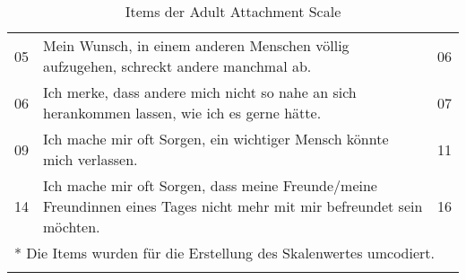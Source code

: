 \begin{table}[htbp]
\begin{tabular}{|l | m{30em} | p{2em}|}
  05 & Mein Wunsch, in einem anderen Menschen völlig aufzugehen, schreckt andere manchmal ab. & 06 \\
  06 & Ich merke, dass andere mich nicht so nahe an sich herankommen lassen, wie ich es gerne hätte. & 07 \\
  09 & Ich mache mir oft Sorgen, ein wichtiger Mensch könnte mich verlassen. & 11 \\
  14 & Ich mache mir oft Sorgen, dass meine Freunde/meine Freundinnen eines Tages nicht mehr mit mir befreundet sein möchten. & 16 \\
  \hline
  \multicolumn{3}{l}{* Die Items wurden für die Erstellung des Skalenwertes umcodiert.}\\
  \multicolumn{3}{l}{}\\
\end{tabular}
\caption{Items der Adult Attachment Scale}
\label{table:AAS}
\end{table}
